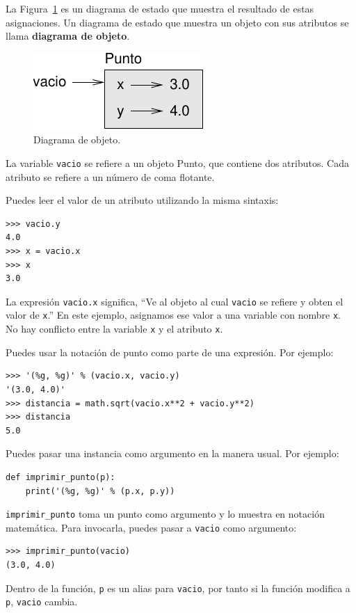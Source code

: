 \documentclass[10pt]{book}
\begin{document}
La Figura~\ref{fig.point} es un diagrama de estado que muestra el resultado de estas asignaciones.
Un diagrama de estado que muestra un objeto con sus atributos se
llama {\bf diagrama de objeto}.

\begin{figure}
\centerline
{\includegraphics[scale=0.8]{figs/point.pdf}}
\caption{Diagrama de objeto.}
\label{fig.point}
\end{figure}

La variable {\tt vacio} se refiere a un objeto Punto, que
contiene dos atributos.  Cada atributo se refiere a un
número de coma flotante.

Puedes leer el valor de un atributo utilizando la misma sintaxis:

\begin{verbatim}
>>> vacio.y
4.0
>>> x = vacio.x
>>> x
3.0
\end{verbatim}
%
La expresión {\tt vacio.x} significa, ``Ve al objeto al cual {\tt vacio}
se refiere y obten el valor de {\tt x}.''  En este ejemplo, asignamos ese
valor a una variable con nombre {\tt x}.  No hay conflicto entre
la variable {\tt x} y el atributo {\tt x}.

Puedes usar la notación de punto como parte de una expresión.  Por ejemplo:

\begin{verbatim}
>>> '(%g, %g)' % (vacio.x, vacio.y)
'(3.0, 4.0)'
>>> distancia = math.sqrt(vacio.x**2 + vacio.y**2)
>>> distancia
5.0
\end{verbatim}
%
Puedes pasar una instancia como argumento en la manera usual.
Por ejemplo:

\begin{verbatim}
def imprimir_punto(p):
    print('(%g, %g)' % (p.x, p.y))
\end{verbatim}
%
\verb"imprimir_punto" toma un punto como argumento y lo muestra en
notación matemática.  Para invocarla, puedes pasar a {\tt vacio} como
argumento:

\begin{verbatim}
>>> imprimir_punto(vacio)
(3.0, 4.0)
\end{verbatim}
%
Dentro de la función, {\tt p} es un alias para {\tt vacio}, por tanto si
la función modifica a {\tt p}, {\tt vacio} cambia.
\end{document}
